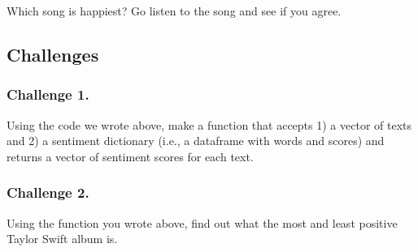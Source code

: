 \documentclass[]{book}
\newenvironment{Shaded}{\begin{snugshade}}{\end{snugshade}}
\newcommand{\KeywordTok}[1]{\textcolor[rgb]{0.13,0.29,0.53}{\textbf{#1}}}
\newcommand{\StringTok}[1]{\textcolor[rgb]{0.31,0.60,0.02}{#1}}
\newcommand{\CommentTok}[1]{\textcolor[rgb]{0.56,0.35,0.01}{\textit{#1}}}
\newcommand{\ControlFlowTok}[1]{\textcolor[rgb]{0.13,0.29,0.53}{\textbf{#1}}}
\newcommand{\OperatorTok}[1]{\textcolor[rgb]{0.81,0.36,0.00}{\textbf{#1}}}
\newcommand{\NormalTok}[1]{#1}
\begin{document}
\begin{Shaded}
\end{Shaded}

Which song is happiest? Go listen to the song and see if you agree.

\subsection{Challenges}\label{challenges-18}

\subsubsection*{Challenge 1.}\label{challenge-1.-16}

Using the code we wrote above, make a function that accepts 1) a vector
of texts and 2) a sentiment dictionary (i.e., a dataframe with words and
scores) and returns a vector of sentiment scores for each text.

\begin{Shaded}
\end{Shaded}

\subsubsection*{Challenge 2.}\label{challenge-2.-15}

Using the function you wrote above, find out what the most and least
positive Taylor Swift album is.
\end{document}
